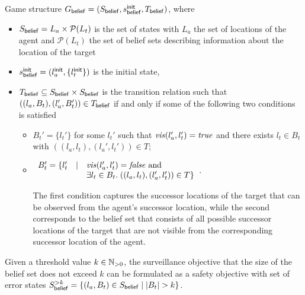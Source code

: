 Game structure $G_{\mathsf{belief}}  = (S_{\mathsf{belief}},s^{\mathsf{init}}_{\mathsf{belief}},T_{\mathsf{belief}})$, where
\begin{itemize}
\item $S_{\mathsf{belief}} = L_a \times \mathcal P(L_t)$ is the set of states with $L_a$ the set of locations of the agent and $\mathcal P(L_t)$ the set of belief sets describing information about the location of the target
\item $s^{\mathsf{init}}_{\mathsf{belief}} = (l_a^{\mathsf{init}},\{l_t^{\mathsf{init}}\})$ is the initial state,
\item $T_{\mathsf{belief}} \subseteq S_{\mathsf{belief}} \times S_{\mathsf{belief}}$ is the transition relation such that $((l_a, B_t),(l_a', B_t')) \in T_{\mathsf{belief}}$ if and only if some of the following two conditions is satisfied
\begin{itemize}
\item $B_t' = \{l_t'\}$ for some $l_t'$ such that $\mathit{vis}(l_a',l_t') = \mathit{true}$ and
there exists $l_t \in B_t$ with $((l_a,l_t),(l_a',l_t')) \in T$;
\item $\begin{array}{lll}
B_t' = \{l_t' & \mid & \mathit{vis}(l_a',l_t') = \mathit{false} \text{ and }\\
&&\exists l_t \in B_t.\; ((l_a,l_t),(l_a',l_t')) \in T\}
\end{array}
$. 

The first condition captures the successor locations of the target that can be observed from the agent's successor location, while the second  corresponds to the belief set that consists of all possible successor locations of the target that are not visible from the corresponding successor location of the agent.
\end{itemize}

\end{itemize}

Given a threshold value $k \in \mathbb{N}_{>0}$, the surveillance objective that the size of the belief set does not exceed $k$ can be formulated as a safety objective with set of error states $S_{\mathsf{belief}}^{>k} = \{(l_a, B_t) \in S_{\mathsf{belief}} \mid |B_t| > k\}$.


